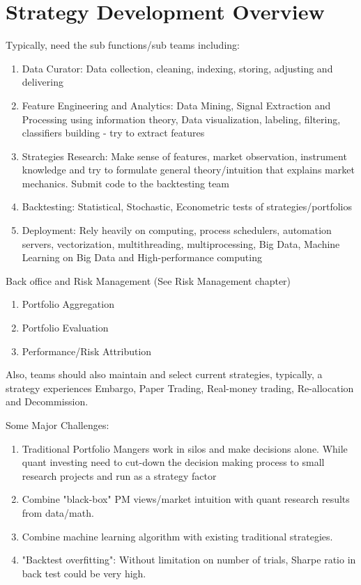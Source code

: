 \documentclass[11pt, openany]{book}              %
\begin{document}
\chapter{Strategy Development Overview}

Typically, need the sub functions/sub teams including:

\begin{enumerate}
 \item Data Curator: Data collection, cleaning, indexing, storing, adjusting and delivering 
 \item Feature Engineering and Analytics: Data Mining, Signal Extraction and Processing using information theory, Data visualization, labeling, filtering, classifiers building - try to extract features
 \item Strategies Research: Make sense of features, market observation, instrument knowledge and try to formulate general theory/intuition that explains market mechanics. Submit code to the backtesting team
 \item Backtesting: Statistical, Stochastic, Econometric tests of strategies/portfolios
 \item Deployment: Rely heavily on computing, process schedulers, automation servers, vectorization, multithreading, multiprocessing, Big Data, Machine Learning on Big Data and High-performance computing 
\end{enumerate}

Back office and Risk Management (See Risk Management chapter)

\begin{enumerate}
 \item Portfolio Aggregation
 \item Portfolio Evaluation
 \item Performance/Risk Attribution
\end{enumerate}

Also, teams should also maintain and select current strategies, typically, a strategy experiences Embargo, Paper Trading, Real-money trading, Re-allocation and Decommission.

Some Major Challenges:

\begin{enumerate}
 \item Traditional Portfolio Mangers work in silos and make decisions alone. While quant investing need to cut-down the decision making process to small research projects and run as a strategy factor
 \item Combine "black-box" PM views/market intuition with quant research results from data/math. 
 \item Combine machine learning algorithm with existing traditional strategies. 	
 \item "Backtest overfitting": Without limitation on number of trials, Sharpe ratio in back test could be very high. 
\end{enumerate}
\end{document}
